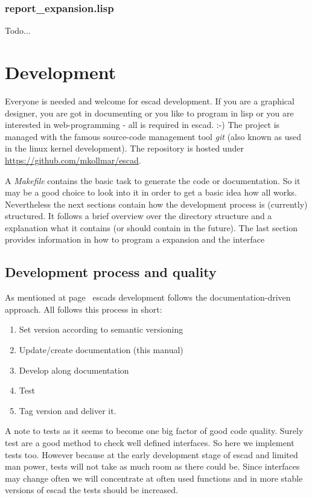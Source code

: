 \documentclass[a4paper, 12pt, openany]{scrbook}
\begin{document}
\subsection{report\_expansion.lisp}
Todo...
\chapter{Development}
Everyone is needed and welcome for escad development. If you are a graphical designer, you are got in documenting or you like to program in lisp or you are interested in web-programming - all is required in escad. :-)
The project is managed with the famous source-code management tool \emph{git} (also known as used in the linux kernel development). The repository is hosted under \url{https://github.com/mkollmar/escad}.

A \emph{Makefile} contains the basic task to generate the code or documentation. So it may be a good choice to look into it in order to get a basic idea how all works. Nevertheless the next sections contain how the development process is (currently) structured. It follows a brief overview over the directory structure and a explanation what it contains (or should contain in the future). The last section provides information in how to program a expansion and the interface
\section{Development process and quality}
As mentioned at page~\pageref{sec:ddd} escads development follows the documentation-driven approach.
All follows this process in short:
\begin{enumerate}
\item Set version according to semantic versioning \parencite{web:semver}
\item Update/create documentation (this manual)
\item Develop along documentation
\item Test
\item Tag version and deliver it.
\end{enumerate}
A note to tests as it seems to become one big factor of good code quality. Surely test are a good method to check well defined interfaces. So here we implement tests too. However because at the early development stage of escad and limited man power, tests will not take as much room as there could be. Since interfaces may change often we will concentrate at often used functions and in more stable versions of escad the tests should be increased.
\end{document}
